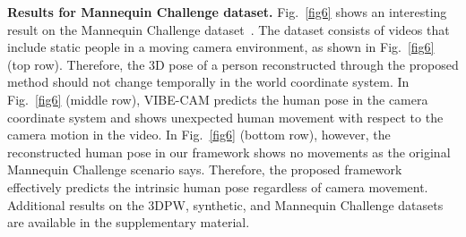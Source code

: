 \documentclass[10pt,twocolumn,letterpaper]{article}
\begin{document}


\textbf{Results for Mannequin Challenge dataset.} Fig.~\ref{fig6} shows an interesting result on the Mannequin Challenge dataset~\cite{li2019learning}. The dataset consists of videos that include static people in a moving camera environment, as shown in Fig.~\ref{fig6} (top row). Therefore, the 3D pose of a person reconstructed through the proposed method should not change temporally in the world coordinate system. In Fig.~\ref{fig6} (middle row), VIBE-CAM predicts the human pose in the camera coordinate system and shows unexpected human movement with respect to the camera motion in the video. In Fig.~\ref{fig6} (bottom row), however, the reconstructed human pose in our framework shows no movements as the original Mannequin Challenge scenario says. Therefore, the proposed framework effectively predicts the intrinsic human pose regardless of camera movement. Additional results on the 3DPW, synthetic, and Mannequin Challenge datasets are available in the supplementary material.



\end{document}
